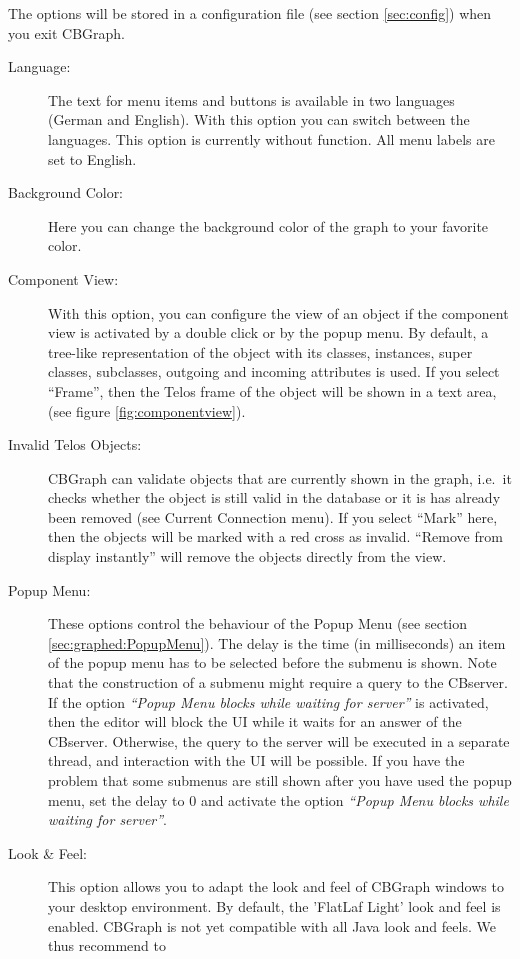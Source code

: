 The options will be stored in a configuration file (see section \ref{sec:config})
when you exit CBGraph.
\begin{description}
\item[Language:] The text for menu items and buttons is available
in two languages (German and English). With this option you can switch
between the languages. This option is currently without function. All
menu labels are set to English.
\item[Background Color:] Here you can change the background color of
the graph to your favorite color.
\item[Component View:] With this option, you can configure the view
of an object if the component view is activated by a double click or
by the popup menu. By default, a tree-like representation of the
object with its classes, instances, super classes, subclasses, outgoing
and incoming attributes is used. If you select ``Frame'', then the
Telos frame of the object will be shown in a text area, (see figure \ref{fig:componentview}).
\item[Invalid Telos Objects:] CBGraph can validate objects
that are currently shown in the graph, i.e.\ it checks whether the object
is still valid in the database or it is has already been removed (see Current
Connection menu). If you select ``Mark'' here, then the objects will be marked
with a red cross as invalid. ``Remove from display instantly'' will remove
the objects directly from the view.
\item[Popup Menu:] These options control the behaviour of the Popup Menu
(see section \ref{sec:graphed:PopupMenu}). The delay is the time (in milliseconds)
an item of the popup menu has to be selected before the submenu is shown. Note that 
the construction of a submenu might require a query to the CBserver.
If the option {\em ``Popup Menu blocks while waiting for server''} is activated, then
the editor will block the UI while it waits for an answer of the CBserver.
Otherwise, the query to the server will be executed in a separate thread, and
interaction with the UI will be possible. If you have the problem that some
submenus are still shown after you have used the popup menu, set the delay to
0 and activate the option {\em ``Popup Menu blocks while waiting for server''}.
\item[Look \& Feel:] This option allows you to adapt the look and feel of CBGraph
windows to your desktop environment. By default, the 'FlatLaf Light' look and feel is enabled.
CBGraph is not yet compatible with all Java look and feels. We thus recommend to

\end{description}

